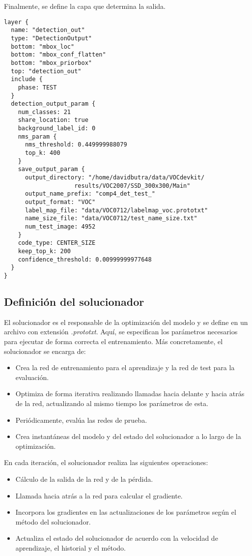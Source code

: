\documentclass[a4paper, 12pt, oneside]{book}
\begin{document}
Finalmente, se define la capa que determina la salida.\\

\begin{lstlisting}[frame=single]
layer {
  name: "detection_out"
  type: "DetectionOutput"
  bottom: "mbox_loc"
  bottom: "mbox_conf_flatten"
  bottom: "mbox_priorbox"
  top: "detection_out"
  include {
    phase: TEST
  }
  detection_output_param {
    num_classes: 21
    share_location: true
    background_label_id: 0
    nms_param {
      nms_threshold: 0.449999988079
      top_k: 400
    }
    save_output_param {
      output_directory: "/home/davidbutra/data/VOCdevkit/
      				results/VOC2007/SSD_300x300/Main"
      output_name_prefix: "comp4_det_test_"
      output_format: "VOC"
      label_map_file: "data/VOC0712/labelmap_voc.prototxt"
      name_size_file: "data/VOC0712/test_name_size.txt"
      num_test_image: 4952
    }
    code_type: CENTER_SIZE
    keep_top_k: 200
    confidence_threshold: 0.00999999977648
  }
}
\end{lstlisting}

\subsection{Definición del solucionador}

El solucionador es el responsable de la optimización del modelo y se define en un archivo con extensión \textit{.prototxt}. Aquí, se especifican los parámetros necesarios para ejecutar de forma correcta el entrenamiento. Más concretamente, el solucionador se encarga de:

\begin{itemize}
\item Crea la red de entrenamiento para el aprendizaje y la red de test para la evaluación.
\item Optimiza de forma iterativa realizando llamadas hacia delante y hacia atrás de la red, actualizando al mismo tiempo los parámetros de esta.
\item Periódicamente, evalúa las redes de prueba.
\item Crea instantáneas del modelo y del estado del solucionador a lo largo de la optimización.
\end{itemize}

En cada iteración, el solucionador realiza las siguientes operaciones:

\begin{itemize}
\item Cálculo de la salida de la red y de la pérdida.
\item Llamada hacia atrás a la red para calcular el gradiente.
\item Incorpora los gradientes en las actualizaciones de los parámetros según el método del solucionador.
\item Actualiza el estado del solucionador de acuerdo con la velocidad de aprendizaje, el historial y el método.
\end{itemize}
\end{document}
